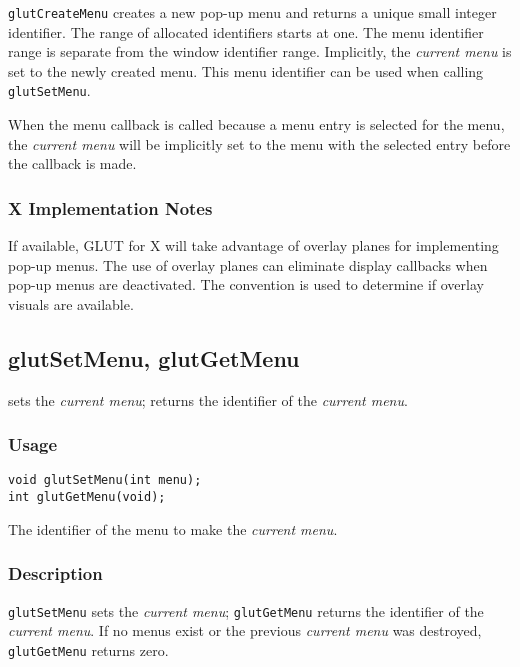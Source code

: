 {\tt glutCreateMenu} creates a new pop-up menu and returns a unique
small integer identifier.  The range of allocated identifiers starts at
one. The menu identifier range is separate from the window identifier
range.  Implicitly, the {\em current menu} is set to the newly created
menu.  This menu identifier can be used when calling {\tt glutSetMenu}.

When the menu callback is called because a menu entry is selected for
the menu, the {\em current menu} will be implicitly set to the menu
with the selected entry before the callback is made.

\subsubsection*{X Implementation Notes}

If available, GLUT for X will take advantage of overlay planes
for implementing pop-up menus.  The use of overlay planes can
eliminate display callbacks when pop-up menus are deactivated.
The  convention \cite{kilgard93-layers} is used to
determine if overlay visuals are available.

\subsection{glutSetMenu, glutGetMenu}

 sets the {\em current menu};  returns the
identifier of the {\em current menu}.

\subsubsection*{Usage}

\begin{verbatim}
void glutSetMenu(int menu);
int glutGetMenu(void);
\end{verbatim}
\begin{description}
\itemsep 0in
\item[{\tt menu}]
The identifier of the menu to make the {\em current menu}.
\end{description}

\subsubsection*{Description}

{\tt glutSetMenu} sets the {\em current menu}; {\tt glutGetMenu} returns the
identifier of the {\em current menu}.
If no menus exist or the previous {\em current menu} was destroyed,
{\tt glutGetMenu} returns zero.


